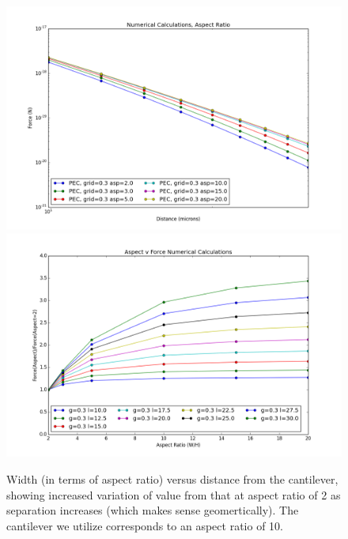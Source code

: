 \documentclass[11pt,traditabstract]{article}
\begin{document}
\begin{figure}[h]
\centering
\includegraphics[width=5in]{force_v_aspect}
\includegraphics[width=5in]{aspect_correction}
\caption{Width (in terms of aspect ratio) versus distance from the cantilever, showing increased variation of value from that at aspect ratio of 2 as separation increases (which makes sense geomertically). The cantilever we utilize corresponds to an aspect ratio of 10.}\label{fig:aspect}
\end{figure}
\end{document}
